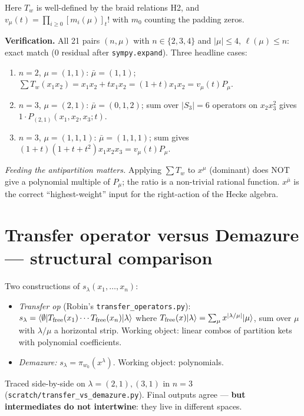 \documentclass[11pt]{article}
\begin{document}
Here $T_w$ is well-defined by the braid relations H2, and $v_\mu(t) =
\prod_{i \geq 0} [m_i(\mu)]_t!$ with $m_0$ counting the padding zeros.

\textbf{Verification.} All 21 pairs $(n, \mu)$ with $n \in \{2, 3, 4\}$ and
$|\mu| \leq 4$, $\ell(\mu) \leq n$: exact match ($0$ residual after
\texttt{sympy.expand}). Three headline cases:
\begin{enumerate}
\item $n = 2$, $\mu = (1, 1)$: $\bar\mu = (1, 1)$;
  $\sum T_w(x_1 x_2) = x_1 x_2 + t x_1 x_2 = (1 + t) x_1 x_2 = v_\mu(t) P_\mu$.
\item $n = 3$, $\mu = (2, 1)$: $\bar\mu = (0, 1, 2)$; sum over $|S_3| = 6$
  operators on $x_2 x_3^2$ gives $1 \cdot P_{(2,1)}(x_1, x_2, x_3; t)$.
\item $n = 3$, $\mu = (1, 1, 1)$: $\bar\mu = (1, 1, 1)$; sum gives
  $(1 + t)(1 + t + t^2) x_1 x_2 x_3 = v_\mu(t) P_\mu$.
\end{enumerate}

\emph{Feeding the antipartition matters.} Applying $\sum T_w$ to $x^\mu$
(dominant) does NOT give a polynomial multiple of $P_\mu$; the ratio is a
non-trivial rational function. $x^{\bar\mu}$ is the correct
``highest-weight'' input for the right-action of the Hecke algebra.

\section{Transfer operator versus Demazure --- structural comparison}

Two constructions of $s_\lambda(x_1, \ldots, x_n)$:
\begin{itemize}
\item \emph{Transfer op} (Robin's \texttt{transfer\_operators.py}):
$s_\lambda = \langle \emptyset | T_{\rm free}(x_1) \cdots T_{\rm free}(x_n) | \lambda \rangle$
where $T_{\rm free}(x)|\lambda\rangle = \sum_{\mu} x^{|\lambda/\mu|} |\mu\rangle$,
sum over $\mu$ with $\lambda/\mu$ a horizontal strip. Working object: linear
combos of partition kets with polynomial coefficients.
\item \emph{Demazure:} $s_\lambda = \pi_{w_0}(x^\lambda)$. Working object:
polynomials.
\end{itemize}

Traced side-by-side on $\lambda = (2, 1), (3, 1)$ in $n = 3$
(\texttt{scratch/transfer\_vs\_demazure.py}). Final outputs agree ---
\textbf{but intermediates do not intertwine}: they live in different spaces.
\end{document}
